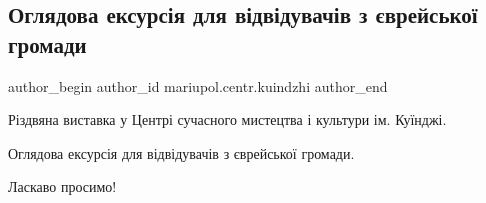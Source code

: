  
 
 
 
 

\subsection{Оглядова ексурсія для відвідувачів з єврейської громади}
\label{sec:10_01_2020.fb.mariupol.centr.kuindzhi.1.ogljadova_ekskursia_evrejska_gromada}

\ifcmt
 author_begin
   author_id mariupol.centr.kuindzhi
 author_end
\fi

Різдвяна виставка у Центрі сучасного мистецтва і культури ім. Куїнджі. 

Оглядова ексурсія для відвідувачів з єврейської громади.

Ласкаво просимо!
